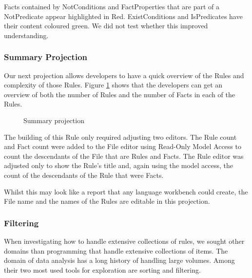 Facts contained by NotConditions and FactProperties that are part of a NotPredicate appear highlighted in Red.
ExistConditions and IsPredicates have their content coloured green.
We did not test whether this improved understanding.

\subsubsection{Summary Projection}
Our next projection allows developers to have a quick overview of the Rules and complexity of those Rules.
Figure \ref{fig:summaryProjection} shows that the developers can get an overview of both the number of Rules and the number of Facts in each of the Rules.

\begin{figure}[h]
    \centering
    \caption{Summary projection}
    \label{fig:summaryProjection}
\end{figure}

The building of this Rule only required adjusting two editors.
The Rule count and Fact count were added to the File editor using Read-Only Model Access to count the descendants of the File that are Rules and Facts.
The Rule editor was adjusted only to show the Rule's title and, again using the model access, the count of the descendants of the Rule that were Facts.

Whilst this may look like a report that any language workbench could create, the File name and the names of the Rules are editable in this projection.

\subsubsection{Filtering}
When investigating how to handle extensive collections of rules, we sought other domains than programming that handle extensive collections of items.
The domain of data analysis has a long history of handling large volumes.
Among their two most used tools for exploration are sorting and filtering.

